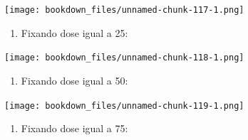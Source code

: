 \documentclass[
]{article}
\newenvironment{Shaded}{\begin{snugshade}}{\end{snugshade}}
\newcommand{\DataTypeTok}[1]{\textcolor[rgb]{0.13,0.29,0.53}{#1}}
\newcommand{\DecValTok}[1]{\textcolor[rgb]{0.00,0.00,0.81}{#1}}
\newcommand{\KeywordTok}[1]{\textcolor[rgb]{0.13,0.29,0.53}{\textbf{#1}}}
\newcommand{\NormalTok}[1]{#1}
\newcommand{\OperatorTok}[1]{\textcolor[rgb]{0.81,0.36,0.00}{\textbf{#1}}}
\newcommand{\StringTok}[1]{\textcolor[rgb]{0.31,0.60,0.02}{#1}}
\providecommand{\tightlist}{%
  \setlength{\itemsep}{0pt}\setlength{\parskip}{0pt}}
\begin{document}
\texttt{[image: bookdown\_files/unnamed-chunk-117-1.png]}

\begin{enumerate}
\def\labelenumi{\arabic{enumi}.}
\setcounter{enumi}{8}
\tightlist
\item
  Fixando dose igual a 25:
\end{enumerate}

\begin{Shaded}
\end{Shaded}

\texttt{[image: bookdown\_files/unnamed-chunk-118-1.png]}

\begin{enumerate}
\def\labelenumi{\arabic{enumi}.}
\setcounter{enumi}{9}
\tightlist
\item
  Fixando dose igual a 50:
\end{enumerate}

\begin{Shaded}
\end{Shaded}

\texttt{[image: bookdown\_files/unnamed-chunk-119-1.png]}

\begin{enumerate}
\def\labelenumi{\arabic{enumi}.}
\setcounter{enumi}{10}
\tightlist
\item
  Fixando dose igual a 75:
\end{enumerate}

\begin{Shaded}
\end{Shaded}
\end{document}
